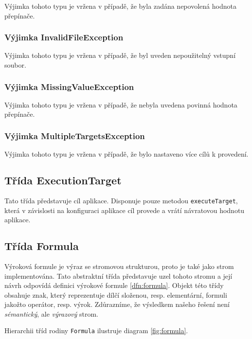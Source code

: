 \documentclass[thesis=B,czech,hidelinks]{thesis}[2012/06/26]
\begin{document}
Výjimka tohoto typu je vržena v případě, že byla zadána nepovolená hodnota přepínače.

\subsubsection{Výjimka InvalidFileException}

Výjimka tohoto typu je vržena v případě, že byl uveden nepoužitelný vstupní soubor.

\subsubsection{Výjimka MissingValueException}

Výjimka tohoto typu je vržena v případě, že nebyla uvedena povinná hodnota přepínače.

\subsubsection{Výjimka MultipleTargetsException}

Výjimka tohoto typu je vržena v případě, že bylo nastaveno více cílů k provedení.

\subsection{Třída ExecutionTarget}

Tato třída představuje cíl aplikace. Disponuje pouze metodou \texttt{executeTarget}, která v závislosti na konfiguraci aplikace cíl provede a vrátí návratovou hodnotu aplikace.

\subsection{Třída Formula}

Výroková formule je výraz se stromovou strukturou, proto je také jako strom implementována. Tato abstraktní třída představuje uzel tohoto stromu a její návrh odpovídá definici výrokové formule \ref{dfn:formula}. Objekt této třídy obsahuje znak, který reprezentuje dílčí složenou, resp. elementární, formuli jakožto operátor, resp. výrok. Zdůrazníme, že výsledkem našeho řešení není \emph{sémantický}, ale \emph{výrazový} strom.

Hierarchii tříd rodiny \texttt{Formula} ilustruje diagram \ref{fig:formula}.
\end{document}
